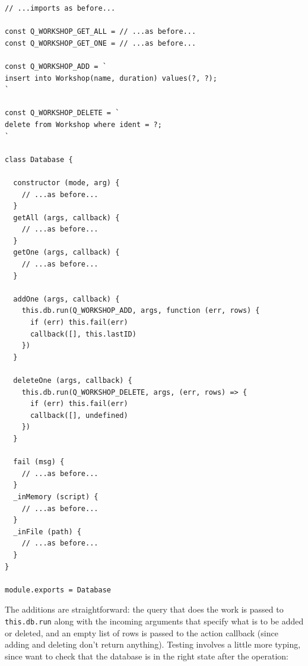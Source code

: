 \begin{verbatim}
// ...imports as before...

const Q_WORKSHOP_GET_ALL = // ...as before...
const Q_WORKSHOP_GET_ONE = // ...as before...

const Q_WORKSHOP_ADD = `
insert into Workshop(name, duration) values(?, ?);
`

const Q_WORKSHOP_DELETE = `
delete from Workshop where ident = ?;
`

class Database {

  constructor (mode, arg) {
    // ...as before...
  }
  getAll (args, callback) {
    // ...as before...
  }
  getOne (args, callback) {
    // ...as before...
  }

  addOne (args, callback) {
    this.db.run(Q_WORKSHOP_ADD, args, function (err, rows) {
      if (err) this.fail(err)
      callback([], this.lastID)
    })
  }

  deleteOne (args, callback) {
    this.db.run(Q_WORKSHOP_DELETE, args, (err, rows) => {
      if (err) this.fail(err)
      callback([], undefined)
    })
  }

  fail (msg) {
    // ...as before...
  }
  _inMemory (script) {
    // ...as before...
  }
  _inFile (path) {
    // ...as before...
  }
}

module.exports = Database
\end{verbatim}

The additions are straightforward: the query that does the work is
passed to \texttt{this.db.run} along with the incoming arguments that
specify what is to be added or deleted, and an empty list of rows is
passed to the action callback (since adding and deleting don't return
anything). Testing involves a little more typing, since want to check
that the database is in the right state after the operation:

